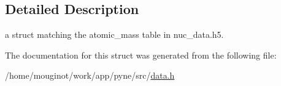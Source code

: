 \subsection{Detailed Description}
a struct matching the atomic\+\_\+mass table in nuc\+\_\+data.\+h5. 

The documentation for this struct was generated from the following file\+:\begin{DoxyCompactItemize}
\item 
/home/mouginot/work/app/pyne/src/\hyperlink{data_8h}{data.\+h}\end{DoxyCompactItemize}
